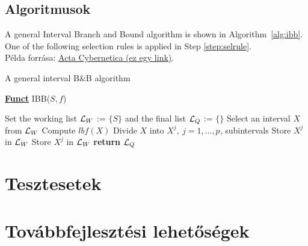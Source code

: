 \subsection{Algoritmusok} %

A general Interval Branch and Bound algorithm is shown in Algorithm~\ref{alg:ibb}. One of the following selection rules is applied in Step \ref{step:selrule}.\\
Példa forrása: \href{https://www.inf.u-szeged.hu/actacybernetica/}{Acta Cybernetica (ez egy link)}.

\begin{algorithm}[H]
\caption{A general interval B\&B algorithm} 
\label{alg:ibb} 
\textbf{\underline{Funct}} IBB($S,f$)
\begin{algorithmic}[1] %
\State Set the working list ${\cal L}_W$ := $\{S\}$ and the final list ${\cal L}_Q$ := $\{\}$     
 \label{alg:igoend}
	\State  Select an interval $X$ from ${\cal L}_W$ \label{step:selrule}  
	\State Compute $lbf(X)$ 		  
	 
		\State Divide $X$ into $X^j,\ j=1,\dots, p$, subintervals   
			 
				\State Store $X^j$ in ${\cal L}_W$ 
			\Else
				\State Store $X^j$ in ${\cal L}_W$ 
			\EndIf
		\EndFor  
	\EndIf
\EndWhile
\State \textbf{return} ${\cal L}_Q$
\end{algorithmic}
\end{algorithm}

\section{Tesztesetek}

\section{Továbbfejlesztési lehetőségek}